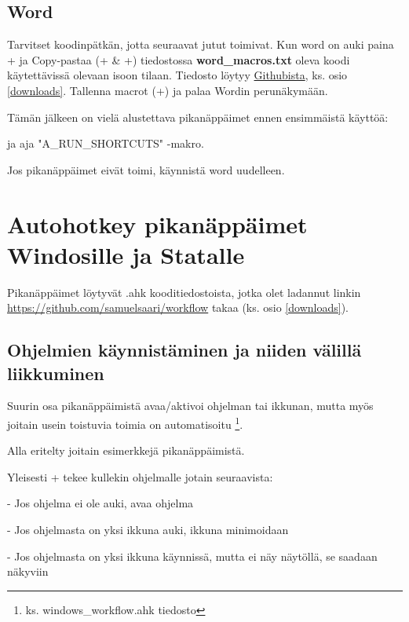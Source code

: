 \documentclass[a4paper,12pt]{scrartcl}
\begin{document}
\subsection{Word}
Tarvitset koodinpätkän, jotta seuraavat jutut toimivat. Kun word on auki paina + ja Copy-pastaa (+ \& +) tiedostossa \textbf{word\_macros.txt} oleva koodi käytettävissä olevaan isoon tilaan. Tiedosto löytyy \href{https://github.com/samuelsaari/workflow}{Githubista}, ks. osio \ref{downloads}. Tallenna macrot (+) ja palaa Wordin perunäkymään.

Tämän jälkeen on vielä alustettava pikanäppäimet ennen ensimmäistä käyttöä:


 ja aja "A\_RUN\_SHORTCUTS" -makro.

Jos pikanäppäimet eivät toimi, käynnistä word uudelleen. 



\section{Autohotkey pikanäppäimet Windosille ja Statalle}
Pikanäppäimet löytyvät \*.ahk kooditiedostoista, jotka olet ladannut linkin \url{https://github.com/samuelsaari/workflow} takaa (ks. osio \ref{downloads}).

\subsection{Ohjelmien käynnistäminen ja niiden välillä liikkuminen}\label{roar}

Suurin osa pikanäppäimistä avaa/aktivoi ohjelman tai ikkunan, mutta myös joitain usein toistuvia toimia on automatisoitu \footnote{ks. windows\_workflow.ahk tiedosto}.

\medskip

Alla eritelty joitain esimerkkejä pikanäppäimistä.

Yleisesti + tekee kullekin ohjelmalle jotain seuraavista:

- Jos ohjelma ei ole auki, avaa ohjelma

- Jos ohjelmasta on yksi ikkuna auki, ikkuna minimoidaan

- Jos ohjelmasta on yksi ikkuna käynnissä, mutta ei näy näytöllä, se saadaan näkyviin
\end{document}
